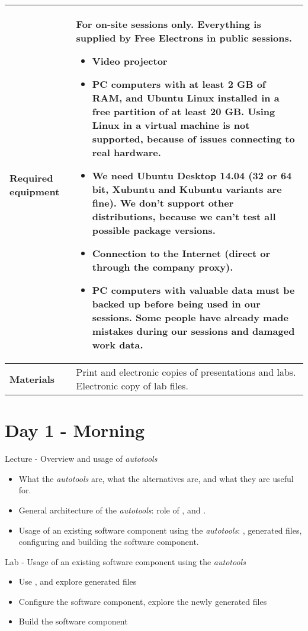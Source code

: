 \documentclass[a4paper,12pt,obeyspaces,spaces,hyphens]{article}
\begin{document}
{  \begin{tabularx}{\textwidth}{|g|h|}
    {\bf Required equipment} &
    {\bf For on-site sessions only.}
    \newline Everything is supplied by Free Electrons in public
    sessions.
    \begin{itemize}
    \item Video projector
    \item PC computers with at least 2 GB of RAM, and Ubuntu Linux
    installed in a {\bf free partition of at least 20 GB. Using Linux
      in a virtual machine is not supported}, because of issues
    connecting to real hardware.
    \item We need Ubuntu Desktop 14.04 (32 or 64 bit, Xubuntu and
    Kubuntu variants are fine). We don't support other
    distributions, because we can't test all possible package versions.
    \item {\bf Connection to the Internet} (direct or through the
    company proxy).
    \item {\bf PC computers with valuable data must be backed up}
    before being used in our sessions.  Some people have already made
    mistakes during our sessions and damaged work data.
    \end{itemize}\\
    \hline

    {\bf Materials} & Print and electronic copies of presentations and
    labs.
    \newline Electronic copy of lab files.\\
    \hline

\end{tabularx}}
\normalsize

\section{Day 1 - Morning}

\feagendatwocolumn
{Lecture - Overview and usage of {\em autotools}}
{
  \begin{itemize}
  \item What the {\em autotools} are, what the alternatives are, and
    what they are useful for.
  \item General architecture of the {\em autotools}: role of
    ,  and .
  \item Usage of an existing software component using the {\em
      autotools}: , generated files, configuring and
    building the software component.
  \end{itemize}
}
{Lab - Usage of an existing software component using the {\em autotools}}
{
  \begin{itemize}
  \item Use , and explore generated files
  \item Configure the software component, explore the newly generated
    files
  \item Build the software component
  \end{itemize}
}
\end{document}
